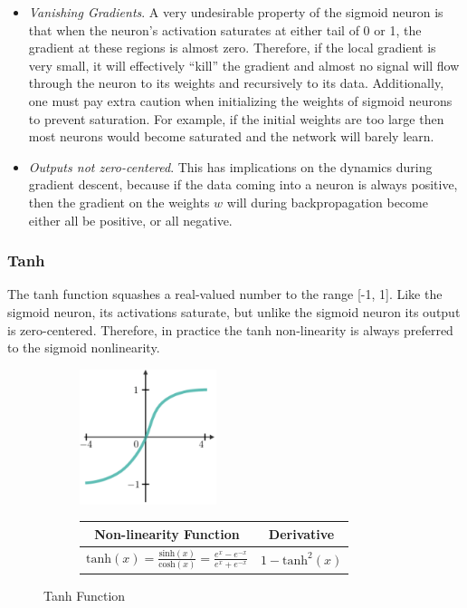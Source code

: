 \documentclass[11pt]{article}
\numberwithin{equation}{section}
\theoremstyle{definition}%
\begin{document}
\begin{itemize}
    \item {\emph{Vanishing Gradients}. A very undesirable property of the sigmoid neuron is that when the neuron's activation saturates at either tail of 0 or 1, the gradient at these regions is almost zero. Therefore, if the local gradient is very small, it will effectively “kill” the gradient and almost no signal will flow through the neuron to its weights and recursively to its data. Additionally, one must pay extra caution when initializing the weights of sigmoid neurons to prevent saturation. For example, if the initial weights are too large then most neurons would become saturated and the network will barely learn.}
    \item {\emph{Outputs not zero-centered}.  This has implications on the dynamics during gradient descent, because if the data coming into a neuron is always positive, then the gradient on the weights $w$ will during backpropagation become either all be positive, or all negative.}
\end{itemize}


\subsubsection{Tanh}
The tanh function squashes a real-valued number to the range [-1, 1]. Like the sigmoid neuron, its activations saturate, but unlike the sigmoid neuron its output is zero-centered. Therefore, in practice the tanh non-linearity is always preferred to the sigmoid nonlinearity.

\begin{figure}[h]
    \begin{center}
        \begin{subfigure}{0.35\textwidth}
            \includegraphics[width=4cm]{./Figs/tanh.png}%
        \label{fig:tanh_graph}
        \end{subfigure}
        \begin{subfigure}{0.35\textwidth}
            \begin{tabular}{||c c||} 
                \hline
                Non-linearity Function & Derivative \\ [0.5ex] 
                \hline
                $\text{tanh}(x) = \frac{\text{sinh}(x)}{\text{cosh}(x)} = \frac{e^{x}-e^{-x}}{e^{x}+e^{-x}}$ & $1 - \text{tanh}^{2}(x)$ \\ [1ex] 
                \hline
            \end{tabular}
        \label{fig:tanh_math}
        \end{subfigure}
    \end{center}
    \caption{Tanh Function}
    \label{fig:tanh}
\end{figure}
\end{document}
